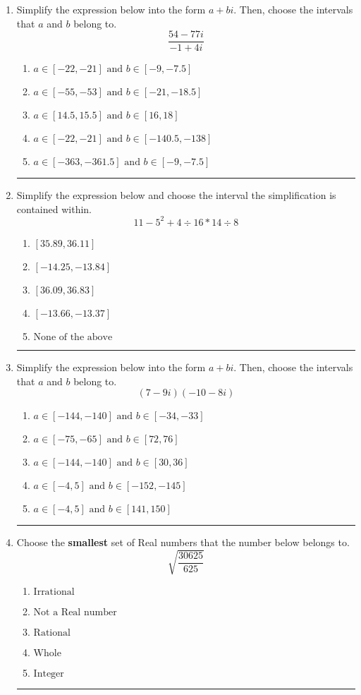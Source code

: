 \documentclass[14pt]{extbook}
\newcommand{\litem}[1]{\item#1\hspace*{-1cm}\rule{\textwidth}{0.4pt}}
\begin{document}
\begin{enumerate}
{\begin{enumerate}[label=\Alph*.]
\end{enumerate} }
\litem{
Simplify the expression below into the form $a+bi$. Then, choose the intervals that $a$ and $b$ belong to.\[ \frac{54 - 77 i}{-1 + 4 i} \]\begin{enumerate}[label=\Alph*.]
\item \( a \in [-22, -21] \text{ and } b \in [-9, -7.5] \)
\item \( a \in [-55, -53] \text{ and } b \in [-21, -18.5] \)
\item \( a \in [14.5, 15.5] \text{ and } b \in [16, 18] \)
\item \( a \in [-22, -21] \text{ and } b \in [-140.5, -138] \)
\item \( a \in [-363, -361.5] \text{ and } b \in [-9, -7.5] \)

\end{enumerate} }
\litem{
Simplify the expression below and choose the interval the simplification is contained within.\[ 11 - 5^2 + 4 \div 16 * 14 \div 8 \]\begin{enumerate}[label=\Alph*.]
\item \( [35.89, 36.11] \)
\item \( [-14.25, -13.84] \)
\item \( [36.09, 36.83] \)
\item \( [-13.66, -13.37] \)
\item \( \text{None of the above} \)

\end{enumerate} }
\litem{
Simplify the expression below into the form $a+bi$. Then, choose the intervals that $a$ and $b$ belong to.\[ (7 - 9 i)(-10 - 8 i) \]\begin{enumerate}[label=\Alph*.]
\item \( a \in [-144, -140] \text{ and } b \in [-34, -33] \)
\item \( a \in [-75, -65] \text{ and } b \in [72, 76] \)
\item \( a \in [-144, -140] \text{ and } b \in [30, 36] \)
\item \( a \in [-4, 5] \text{ and } b \in [-152, -145] \)
\item \( a \in [-4, 5] \text{ and } b \in [141, 150] \)

\end{enumerate} }
\litem{
Choose the \textbf{smallest} set of Real numbers that the number below belongs to.\[ \sqrt{\frac{30625}{625}} \]\begin{enumerate}[label=\Alph*.]
\item \( \text{Irrational} \)
\item \( \text{Not a Real number} \)
\item \( \text{Rational} \)
\item \( \text{Whole} \)
\item \( \text{Integer} \)


\end{enumerate}}
\end{enumerate}
\end{document}
